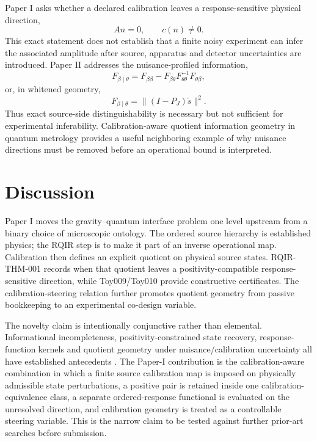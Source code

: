 \documentclass[11pt]{article}
\begin{document}
Paper I asks whether a declared calibration leaves a response-sensitive physical direction,
\begin{equation}
 An=0,\qquad c(n)\neq0.
\end{equation}
This exact statement does not establish that a finite noisy experiment can infer the associated amplitude after source, apparatus and detector uncertainties are introduced. Paper II addresses the nuisance-profiled information,
\begin{equation}
 F_{\beta\mid\theta}=F_{\beta\beta}
 -F_{\beta\theta}F_{\theta\theta}^{-1}F_{\theta\beta},
\end{equation}
or, in whitened geometry,
\begin{equation}
 F_{\beta\mid\theta}=\lVert (I-P_J)\tilde s\rVert^2.
\end{equation}
Thus exact source-side distinguishability is necessary but not sufficient for experimental inferability. Calibration-aware quotient information geometry in quantum metrology \cite{WaniAlKuwari2026} provides a useful neighboring example of why nuisance directions must be removed before an operational bound is interpreted.

\section{Discussion}

Paper I moves the gravity--quantum interface problem one level upstream from a binary choice of microscopic ontology. The ordered source hierarchy is established physics; the RQIR step is to make it part of an inverse operational map. Calibration then defines an explicit quotient on physical source states. RQIR-THM-001 records when that quotient leaves a positivity-compatible response-sensitive direction, while Toy009/Toy010 provide constructive certificates. The calibration-steering relation further promotes quotient geometry from passive bookkeeping to an experimental co-design variable.

The novelty claim is intentionally conjunctive rather than elemental. Informational incompleteness, positivity-constrained state recovery, response-function kernels and quotient geometry under nuisance/calibration uncertainty all have established antecedents \cite{TeoRehacekHradil2013,KalevKosutDeutsch2015,Giesbertz2015,Giesbertz2016,WaniAlKuwari2026}. The Paper-I contribution is the calibration-aware combination in which a finite source calibration map is imposed on physically admissible state perturbations, a positive pair is retained inside one calibration-equivalence class, a separate ordered-response functional is evaluated on the unresolved direction, and calibration geometry is treated as a controllable steering variable. This is the narrow claim to be tested against further prior-art searches before submission.
\end{document}
